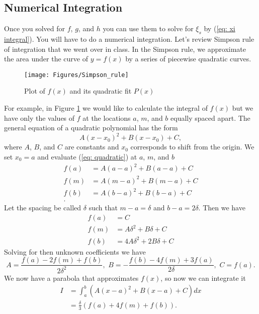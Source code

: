 \documentclass{article}
\begin{document}
\subsection{Numerical Integration}
Once you solved for $f$, $g$, and $h$ you can use them to solve for $\xi_s$ by (\ref{eq: xi integral}). You will have to do a numerical integration. Let's review Simpson rule of integration that we went over in class. In the Simpson rule, we approximate the area under the curve of $y=f(x)$ by a series of piecewise quadratic curves.  
\begin{figure}[h!]
\begin{center}
\texttt{[image: Figures/Simpson\_rule]}
\end{center}
\caption{Plot of $f(x)$ and its quadratic fit $P(x)$}
\label{fig: simpson rule}
\end{figure}
For example, in Figure \ref{fig: simpson rule} we would like to calculate the integral of $f(x)$ but we have only the values of $f$ at the locations $a$, $m$, and $b$ equally spaced apart. The general equation of a quadratic polynomial has the form
\begin{equation}
\label{eq: quadratic}
A(x-x_0)^2+B(x-x_0)+C,
\end{equation}
where $A$, $B$, and $C$ are constants and $x_0$ corresponds to shift from the origin. We set $x_0=a$ and evaluate (\ref{eq: quadratic}) at $a$, $m$, and $b$
\begin{align*}
f(a) &= A(a-a)^2 + B(a-a) + C\\
f(m) &= A(m-a)^2 + B(m-a) + C\\
f(b) &= A(b-a)^2 + B(b-a) + C\\.
\end{align*}
Let the spacing be called $\delta$ such that $m-a = \delta$ and $b-a = 2\delta$. Then we have
\begin{align*}
f(a) &=  C\\
f(m) &= A\delta ^2+ B\delta + C\\
f(b) &= 4A\delta^2 + 2B\delta + C
\end{align*}
Solving for then unknown coefficients we have
\begin{equation*}
A = \frac{f(a) - 2f(m) + f(b)}{2\delta^2}, \,\,
B = -\frac{f(b)-4f(m)+3f(a)}{2\delta}, \,\,
C = f(a).
\end{equation*}
We now have a parabola that approximates $f(x)$, so now we can integrate it
\begin{align*}
I &= \int^b_a \left(A(x-a)^2 + B(x-a) + C\right) dx\\
&= \frac{\delta}{3}\left(f(a) + 4f(m) + f(b)\right).
\end{align*}
\end{document}
